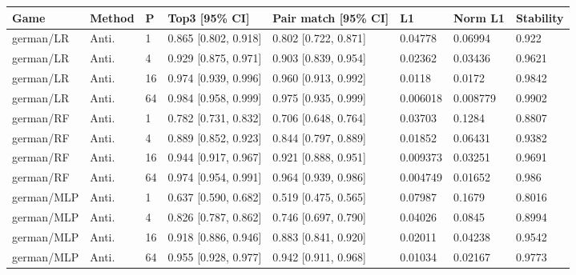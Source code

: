 \begingroup\footnotesize\setlength{\tabcolsep}{3pt}
\begin{tabular}{llllllll}
\toprule
Game & Method & P & Top3 [95\% CI] & Pair match [95\% CI] & L1 & Norm L1 & Stability \\
\midrule
german/LR & Anti. & 1 & 0.865 [0.802, 0.918] & 0.802 [0.722, 0.871] & 0.04778 & 0.06994 & 0.922 \\
german/LR & Anti. & 4 & 0.929 [0.875, 0.971] & 0.903 [0.839, 0.954] & 0.02362 & 0.03436 & 0.9621 \\
german/LR & Anti. & 16 & 0.974 [0.939, 0.996] & 0.960 [0.913, 0.992] & 0.0118 & 0.0172 & 0.9842 \\
german/LR & Anti. & 64 & 0.984 [0.958, 0.999] & 0.975 [0.935, 0.999] & 0.006018 & 0.008779 & 0.9902 \\
german/RF & Anti. & 1 & 0.782 [0.731, 0.832] & 0.706 [0.648, 0.764] & 0.03703 & 0.1284 & 0.8807 \\
german/RF & Anti. & 4 & 0.889 [0.852, 0.923] & 0.844 [0.797, 0.889] & 0.01852 & 0.06431 & 0.9382 \\
german/RF & Anti. & 16 & 0.944 [0.917, 0.967] & 0.921 [0.888, 0.951] & 0.009373 & 0.03251 & 0.9691 \\
german/RF & Anti. & 64 & 0.974 [0.954, 0.991] & 0.964 [0.939, 0.986] & 0.004749 & 0.01652 & 0.986 \\
german/MLP & Anti. & 1 & 0.637 [0.590, 0.682] & 0.519 [0.475, 0.565] & 0.07987 & 0.1679 & 0.8016 \\
german/MLP & Anti. & 4 & 0.826 [0.787, 0.862] & 0.746 [0.697, 0.790] & 0.04026 & 0.0845 & 0.8994 \\
german/MLP & Anti. & 16 & 0.918 [0.886, 0.946] & 0.883 [0.841, 0.920] & 0.02011 & 0.04238 & 0.9542 \\
german/MLP & Anti. & 64 & 0.955 [0.928, 0.977] & 0.942 [0.911, 0.968] & 0.01034 & 0.02167 & 0.9773 \\
\bottomrule
\end{tabular}

\endgroup
